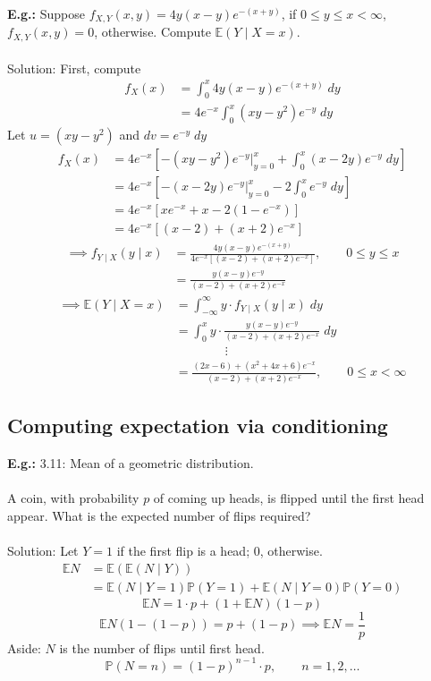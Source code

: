 \documentclass[a4paper]{article}
\newcommand{\n}{\hfill\break}
\newcommand{\eg}[1]{\par\noindent\settowidth{\hangindent}{\textbf{E.g.: }}\textbf{E.g.: }#1\n}
\newcommand{\Prob}{\mathbb{P}}
\renewcommand{\P}{\Prob}
\newcommand{\Avg}{\mathbb{E}}
\newcommand{\E}{\Avg}
\begin{document}
\eg{
    Suppose $f_{X,Y}(x,y)=4y(x-y)e^{-(x+y)}$, if $0\leq y\leq x<\infty$, $f_{X,Y}(x,y)=0$, otherwise. Compute $\E(Y\mid X=x)$.
    \\\\
    Solution: First, compute
    \begin{align*}
        f_X(x) &= \int^x_0 4y(x-y)e^{-(x+y)}\;dy \\
        &= 4e^{-x} \int^x_0(xy-y^2)e^{-y}\;dy
    \end{align*}
    Let $u=(xy-y^2)$ and $dv=e^{-y}\;dy$
    \begin{align*}
        f_X(x) &= 4e^{-x}\left[-(xy-y^2)e^{-y}\big\vert^x_{y=0}+\int^x_0(x-2y)e^{-y}\;dy\right] \\
        &= 4e^{-x}\left[-(x-2y)e^{-y}\big\vert^x_{y=0}-2\int^x_0e^{-y}\;dy\right] \\
        &= 4e^{-x}[xe^{-x}+x-2(1-e^{-x})] \\
        &= 4e^{-x}[(x-2)+(x+2)e^{-x}]
    \end{align*}
    \begin{align*}
        \implies f_{Y\mid X}(y\mid x) &= \frac{4y(x-y)e^{-(x+y)}}{4e^{-x}[(x-2)+(x+2)e^{-x}]}, \qquad 0\leq y\leq x \\
        &=\frac{y(x-y)e^{-y}}{(x-2)+(x+2)e^{-x}}
    \end{align*}
    \begin{align*}
        \implies \E(Y\mid X=x) &= \int^\infty_{-\infty} y\cdot f_{Y\mid X}(y\mid x)\;dy \\
        &=\int^x_0 y\cdot\frac{y(x-y)e^{-y}}{(x-2)+(x+2)e^{-x}}\;dy \\
        &\qquad\qquad\vdots \\
        &=\frac{(2x-6)+(x^2+4x+6)e^{-x}}{(x-2)+(x+2)e^{-x}}, \qquad 0\leq x<\infty
    \end{align*}
}

\subsection*{Computing expectation via conditioning}

\eg{
    3.11: Mean of a geometric distribution.
    \\\\
    A coin, with probability $p$ of coming up heads, is flipped until the first head appear. What is the expected number of flips required?
    \\\\
    Solution: Let $Y=1$ if the first flip is a head; $0$, otherwise.
    \begin{align*}
        \E N &= \E(\E(N\mid Y)) \\
        &=\E(N\mid Y=1)\P(Y=1)+\E(N\mid Y=0)\P(Y=0)
    \end{align*}
    \[\E N=1\cdot p+(1+\E N)(1-p)\]
    \[\E N(1-(1-p))=p+(1-p)\implies \E N=\frac{1}{p}\]
    Aside: $N$ is the number of flips until first head.
    \[\P(N=n)=(1-p)^{n-1}\cdot p, \qquad n=1,2,\dots\]
}
\end{document}
